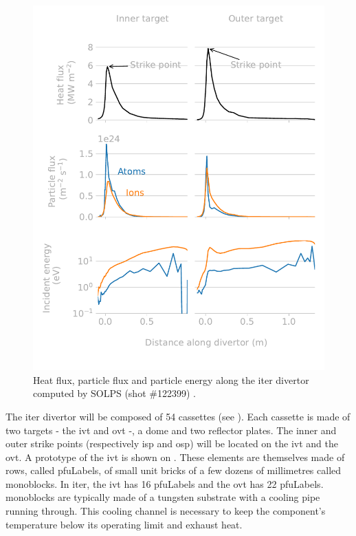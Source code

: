 \begin{figure} [h]
    \centering
    \includegraphics[width=\linewidth]{Figures/Chapter1/divertor_exposure_conditions.pdf}
    \caption{Heat flux, particle flux and particle energy along the \acrshort{iter} divertor computed by SOLPS (shot \#122399) \cite{pitts_physics_2019}.}
\end{figure}

The \acrshort{iter} divertor will be composed of 54 cassettes (see ).
Each cassette is made of two targets - the \gls{ivt} and \gls{ovt} -, a dome and two reflector plates.
The inner and outer \glspl{strike point} (respectively \acrshort{isp} and \acrshort{osp}) will be located on the \gls{ivt} and the \gls{ovt}.
A prototype of the \gls{ivt} is shown on .
These elements are themselves made of rows, called \glspl{pfuLabel}, of small unit bricks of a few dozens of millimetres called \glspl{monoblock}.
In \acrshort{iter}, the \gls{ivt} has 16 \glspl{pfuLabel} and the \gls{ovt} has 22 \glspl{pfuLabel}.
\Glspl{monoblock} are typically made of a tungsten substrate with a cooling pipe running through.
This cooling channel is necessary to keep the component's temperature below its operating limit and exhaust heat.

